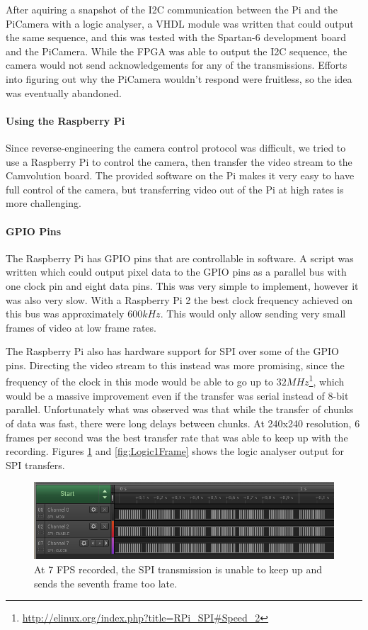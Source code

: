 After aquiring a snapshot of the I2C communication between the Pi and the PiCamera with a logic analyser,
a VHDL module was written that could output the same sequence,
and this was tested with the Spartan-6 development board and the PiCamera.
While the FPGA was able to output the I2C sequence,
the camera would not send acknowledgements for any of the transmissions.
Efforts into figuring out why the PiCamera wouldn't respond were fruitless, so the idea was eventually abandoned.

\paragraph{Using the Raspberry Pi}
Since reverse-engineering the camera control protocol was difficult,
we tried to use a Raspberry Pi to control the camera,
then transfer the video stream to the Camvolution board.
The provided software on the Pi makes it very easy to have full control of the camera,
but transferring video out of the Pi at high rates is more challenging.

\paragraph{GPIO Pins}
The Raspberry Pi has GPIO pins that are controllable in software.
A script was written which could output pixel data to the GPIO pins as a parallel bus with one clock pin and eight data pins.
This was very simple to implement, however it was also very slow.
With a Raspberry Pi 2 the best clock frequency achieved on this bus was approximately $600kHz$.
This would only allow sending very small frames of video at low frame rates.

The Raspberry Pi also has hardware support for SPI over some of the GPIO pins.
Directing the video stream to this instead was more promising,
since the frequency of the clock in this mode would be able to go up to $32MHz$\footnote{\url{http://elinux.org/index.php?title=RPi\_SPI\#Speed\_2}},
which would be a massive improvement even if the transfer was serial instead of 8-bit parallel.
Unfortunately what was observed was that while the transfer of chunks of data was fast,
there were long delays between chunks.
At 240x240 resolution, 6 frames per second was the best transfer rate that was able to keep up with the recording.
Figures \ref{fig:Logic7fps} and \ref{fig:Logic1Frame} shows the logic analyser output for SPI transfers.

\begin{figure}
    \centering
    \includegraphics[width=\linewidth]{img/logic/7fps}
    \caption[At 7 FPS recorded, the SPI transmission is unable to keep up.]{At 7 FPS recorded, the SPI transmission is unable to keep up and sends the seventh frame too late.}
    \label{fig:Logic7fps}
\end{figure}

